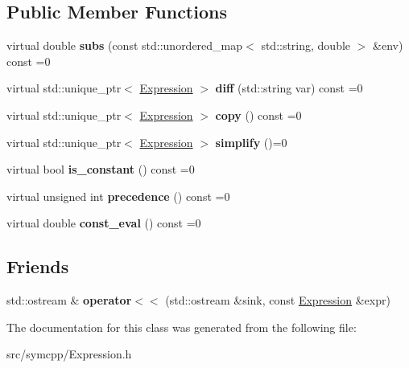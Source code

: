 \subsection*{Public Member Functions}
\begin{DoxyCompactItemize}
\item 
virtual double {\bfseries subs} (const std\+::unordered\+\_\+map$<$ std\+::string, double $>$ \&env) const =0\hypertarget{classExpression_af2a58b06105dbc3a0491c80202329c02}{}\label{classExpression_af2a58b06105dbc3a0491c80202329c02}

\item 
virtual std\+::unique\+\_\+ptr$<$ \hyperlink{classExpression}{Expression} $>$ {\bfseries diff} (std\+::string var) const =0\hypertarget{classExpression_a1521f6dc4d61772933588469c3c478cb}{}\label{classExpression_a1521f6dc4d61772933588469c3c478cb}

\item 
virtual std\+::unique\+\_\+ptr$<$ \hyperlink{classExpression}{Expression} $>$ {\bfseries copy} () const =0\hypertarget{classExpression_a23c613634060557cc281ba0d495ab80b}{}\label{classExpression_a23c613634060557cc281ba0d495ab80b}

\item 
virtual std\+::unique\+\_\+ptr$<$ \hyperlink{classExpression}{Expression} $>$ {\bfseries simplify} ()=0\hypertarget{classExpression_af4eabd874109a8fb84e0a846cd14ae29}{}\label{classExpression_af4eabd874109a8fb84e0a846cd14ae29}

\item 
virtual bool {\bfseries is\+\_\+constant} () const =0\hypertarget{classExpression_a8ffe9a0950dbde78a5bd025a9f348359}{}\label{classExpression_a8ffe9a0950dbde78a5bd025a9f348359}

\item 
virtual unsigned int {\bfseries precedence} () const =0\hypertarget{classExpression_a10f8d5fc41cdeee605eb09d62423782f}{}\label{classExpression_a10f8d5fc41cdeee605eb09d62423782f}

\item 
virtual double {\bfseries const\+\_\+eval} () const =0\hypertarget{classExpression_af94b781d93a85b3012d9e64f19c0dc8a}{}\label{classExpression_af94b781d93a85b3012d9e64f19c0dc8a}

\end{DoxyCompactItemize}
\subsection*{Friends}
\begin{DoxyCompactItemize}
\item 
std\+::ostream \& {\bfseries operator$<$$<$} (std\+::ostream \&sink, const \hyperlink{classExpression}{Expression} \&expr)\hypertarget{classExpression_ade0d81d94acc2274ae8657f14d5636fe}{}\label{classExpression_ade0d81d94acc2274ae8657f14d5636fe}

\end{DoxyCompactItemize}


The documentation for this class was generated from the following file\+:\begin{DoxyCompactItemize}
\item 
src/symcpp/Expression.\+h\end{DoxyCompactItemize}
